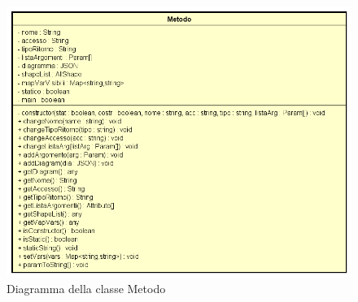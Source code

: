 \begin{figure}[h!]
	\centering
	\includegraphics[scale=0.8]{res/sections/SpecificaFrontEnd/Services/Disegnetti/metodo.png}
	\caption{Diagramma della classe Metodo}
\end{figure}

